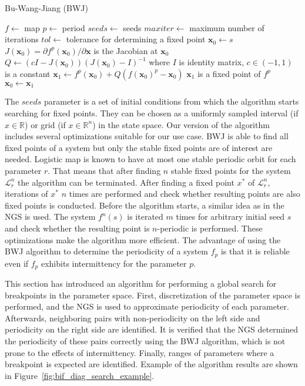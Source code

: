 \begin{algorithm}[!h]
    \caption{Bu-Wang-Jiang (BWJ)}
    \label{alg:bwj}
    \begin{algorithmic}[1]
        \Statex $f \gets$ map
        \Statex $p \gets$ period
        \Statex $seeds \gets$ seeds
        \Statex $maxiter \gets$ maximum number of iterations
        \Statex $tol \gets$ tolerance for determining a fixed point
            \State $\textbf{x}_{0} \gets s$
                \State $J(\textbf{x}_{0}) = \partial f^{p}(\textbf{x}_{0}) / \partial \textbf{x}$ is the Jacobian at $\textbf{x}_{0}$
                \State $Q \gets (cI-J(\textbf{x}_{0}))(J(\textbf{x}_{0})-I)^{-1}$ where $I$ is identity matrix, $c \in (-1, 1)$ is a constant 
                \State $\textbf{x}_1 \gets f^{p}(\textbf{x}_{0}) + Q(f(\textbf{x}_{0})^{p}-\textbf{x}_{0})$
                    \State $\textbf{x}_{1}$ is a fixed point of $f^{p}$
                \EndIf
                \State $\textbf{x}_{0} \gets \textbf{x}_{1}$
            \EndWhile
        \EndFor
    \end{algorithmic}
\end{algorithm}

The $seeds$ parameter is a set of initial conditions from which the algorithm starts searching for fixed points.
They can be chosen as a uniformly sampled interval (if $x \in \mathbb{R}$) or grid (if $x \in \mathbb{R}^{n}$) in the state space.
Our version of the algorithm includes several optimizations suitable for our use case.
BWJ is able to find all fixed points of a system but only the stable fixed points are of interest are needed.
Logistic map is known to have at most one stable periodic orbit for each parameter $r$.
That means that after finding $n$ stable fixed points for the system $\mathcal{L}_{r}^{n}$ the algorithm can be terminated.
After finding a fixed point $x^{*}$ of $\mathcal{L}_{r}^{n}$, iterations of $x^{*}$ $n$ times are performed and check whether resulting points are also fixed points is conducted.
Before the algorithm starts, a similar idea as in the NGS is used.
The system $f^{n}(s)$ is iterated $m$ times for arbitrary initial seed $s$ and check whether the resulting point is $n$-periodic is performed.
These optimizations make the algorithm more efficient.
The advantage of using the BWJ algorithm to determine the periodicity of a system $f_{p}$ is that it is reliable even if $f_{p}$ exhibits intermittency for the parameter $p$.
\par
This section has introduced an algorithm for performing a global search for breakpoints in the parameter space.
First, discretization of the parameter space is performed, and the NGS is used to approximate periodicity of each parameter.
Afterwards, neighboring pairs with non-periodicity on the left side and periodicity on the right side are identified.
It is verified that the NGS determined the periodicity of these pairs correctly using the BWJ algorithm, which is not prone to the effects of intermittency.
Finally, ranges of parameters where a breakpoint is expected are identified.
Example of the algorithm results are shown in Figure~\ref{fig:bif_diag_search_example}.

